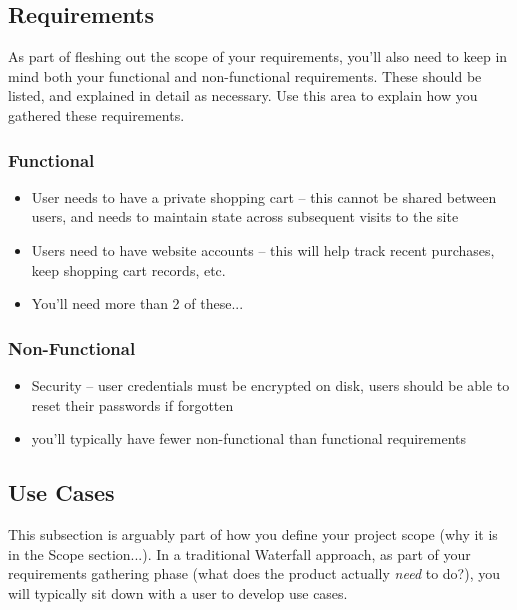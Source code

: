 \documentclass[10pt,conference,onecolumn,compsoc]{IEEEtran}
\begin{document}

\subsection{Requirements}
As part of fleshing out the scope of your requirements, you'll also need to keep in mind both your functional and non-functional requirements.  These should be listed, and explained in detail as necessary.  Use this area to explain how you gathered these requirements.

\subsubsection{Functional}
\begin{itemize}
\item User needs to have a private shopping cart -- this cannot be shared between users, and needs to maintain state across subsequent visits to the site
\item Users need to have website accounts -- this will help track recent purchases, keep shopping cart records, etc.
\item You'll need more than 2 of these...
\end{itemize}

\subsubsection{Non-Functional}
\begin{itemize}
\item Security -- user credentials must be encrypted on disk, users should be able to reset their passwords if forgotten
\item you'll typically have fewer non-functional than functional requirements
\end{itemize}

\subsection{Use Cases}
This subsection is arguably part of how you define your project scope (why it is in the Scope section...).  In a traditional Waterfall approach, as part of your requirements gathering phase (what does the product actually \emph{need} to do?), you will typically sit down with a user to develop use cases.
\end{document}
